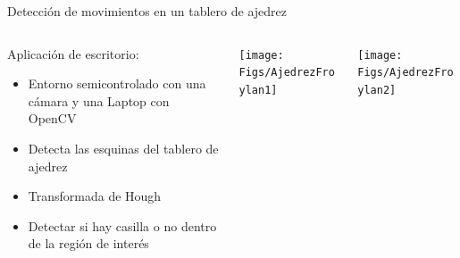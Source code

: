 \begin{frame}{Detección de movimientos en un tablero de ajedrez \footnotemark}
\begin{columns}
\begin{column}{0.38\textwidth}
Aplicación de escritorio:
	\begin{itemize}
\item Entorno semicontrolado con una cámara y una Laptop con OpenCV
\item Detecta las esquinas del tablero de ajedrez
\item Transformada de Hough
\item Detectar si hay casilla o no dentro de la región de interés
	\end{itemize}
\end{column}
\begin{column}{0.28\textwidth}
\begin{center}
     \texttt{[image: Figs/AjedrezFroylan1]}\\
     \end{center}
\end{column}
\begin{column}{0.28\textwidth}
\begin{center}
     \texttt{[image: Figs/AjedrezFroylan2]}
     \end{center}
\end{column}

\end{columns}
\end{frame}

